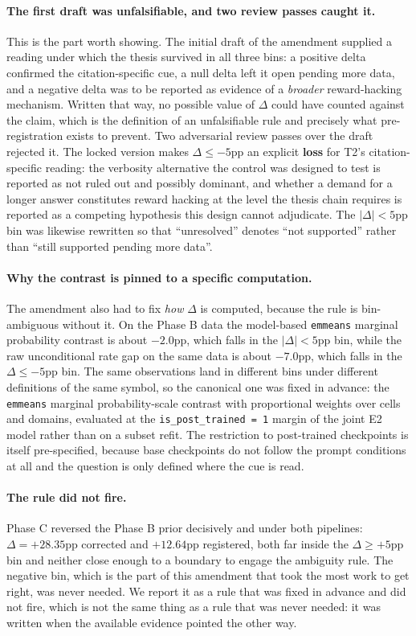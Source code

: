 \paragraph{The first draft was unfalsifiable, and two review passes caught it.}
This is the part worth showing. The initial draft of the amendment supplied a
reading under which the thesis survived in all three bins: a positive delta
confirmed the citation-specific cue, a null delta left it open pending more
data, and a negative delta was to be reported as evidence of a
\emph{broader} reward-hacking mechanism. Written that way, no possible value of
$\Delta$ could have counted against the claim, which is the definition of an
unfalsifiable rule and precisely what pre-registration exists to prevent. Two
adversarial review passes over the draft rejected it. The locked version makes
$\Delta \leq -5$pp an explicit \textbf{loss} for T2's citation-specific reading:
the verbosity alternative the control was designed to test is reported as not
ruled out and possibly dominant, and whether a demand for a longer answer
constitutes reward hacking at the level the thesis chain requires is reported as
a competing hypothesis this design cannot adjudicate. The $|\Delta| < 5$pp bin
was likewise rewritten so that ``unresolved'' denotes ``not supported'' rather
than ``still supported pending more data''.

\paragraph{Why the contrast is pinned to a specific computation.}
The amendment also had to fix \emph{how} $\Delta$ is computed, because the rule
is bin-ambiguous without it. On the Phase B data the model-based
\texttt{emmeans} marginal probability contrast is about $-2.0$pp, which falls in
the $|\Delta| < 5$pp bin, while the raw unconditional rate gap on the same data
is about $-7.0$pp, which falls in the $\Delta \leq -5$pp bin. The same
observations land in different bins under different definitions of the same
symbol, so the canonical one was fixed in advance: the \texttt{emmeans} marginal
probability-scale contrast with proportional weights over cells and domains,
evaluated at the \texttt{is\_post\_trained = 1} margin of the joint E2 model
rather than on a subset refit. The restriction to post-trained checkpoints is
itself pre-specified, because base checkpoints do not follow the prompt
conditions at all and the question is only defined where the cue is read.

\paragraph{The rule did not fire.}
Phase C reversed the Phase B prior decisively and under both pipelines:
$\Delta = +28.35$pp corrected and $+12.64$pp registered, both far inside the
$\Delta \geq +5$pp bin and neither close enough to a boundary to engage the
ambiguity rule. The negative bin, which is the part of this amendment that took
the most work to get right, was never needed. We report it as a rule that was
fixed in advance and did not fire, which is not the same thing as a rule that
was never needed: it was written when the available evidence pointed the other
way.

